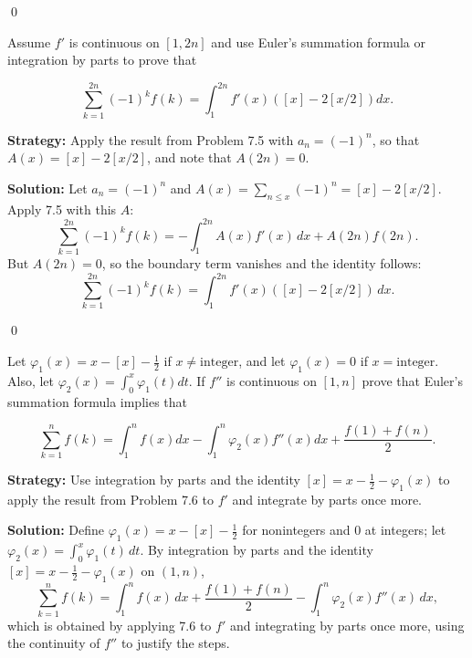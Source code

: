\qed
\begin{problembox}
\begin{problemstatement}
Assume $f'$ is continuous on $[1, 2n]$ and use Euler's summation formula or integration by parts to prove that

\[ \sum_{k=1}^{2n} (-1)^k f(k) = \int_1^{2n} f'(x)([x] - 2[x/2]) dx. \]
\end{problemstatement}
\end{problembox}

\noindent\textbf{Strategy:} Apply the result from Problem 7.5 with $a_n = (-1)^n$, so that $A(x) = [x] - 2[x/2]$, and note that $A(2n) = 0$.

\bigskip\noindent\textbf{Solution:}
Let $a_n=(-1)^n$ and $A(x)=\sum_{n\le x}(-1)^n=[x]-2[x/2]$. Apply 7.5 with this $A$:
\[\sum_{k=1}^{2n}(-1)^k f(k)= -\int_1^{2n} A(x) f'(x)\,dx + A(2n) f(2n).
\]
But $A(2n)=0$, so the boundary term vanishes and the identity follows:
\[\sum_{k=1}^{2n}(-1)^k f(k)=\int_1^{2n} f'(x)([x]-2[x/2])\,dx.\]




\qed
\begin{problembox}
\begin{problemstatement}
Let $\varphi_1(x) = x - [x] - \frac{1}{2}$ if $x \neq \text{integer}$, and let  $\varphi_1(x) = 0$  if  $x = \text{integer}$. Also, let  $\varphi_2(x) = \int_0^x \varphi_1(t) dt$. If  $f''$  is continuous on  $[1, n]$  prove that Euler's summation formula implies that

\[ \sum_{k=1}^n f(k) = \int_1^n f(x) dx - \int_1^n \varphi_2(x) f''(x) dx + \frac{f(1) + f(n)}{2}. \]
\end{problemstatement}
\end{problembox}

\noindent\textbf{Strategy:} Use integration by parts and the identity $[x] = x - \frac{1}{2} - \varphi_1(x)$ to apply the result from Problem 7.6 to $f'$ and integrate by parts once more.

\bigskip\noindent\textbf{Solution:}
Define $\varphi_1(x)=x-[x]-\tfrac12$ for nonintegers and $0$ at integers; let $\varphi_2(x)=\int_0^x \varphi_1(t)\,dt$. By integration by parts and the identity $[x]=x-\tfrac12-\varphi_1(x)$ on $(1,n)$,
\[\sum_{k=1}^n f(k)=\int_1^n f(x)\,dx + \frac{f(1)+f(n)}{2} - \int_1^n \varphi_2(x) f''(x)\,dx,
\]
which is obtained by applying 7.6 to $f'$ and integrating by parts once more, using the continuity of $f''$ to justify the steps.




